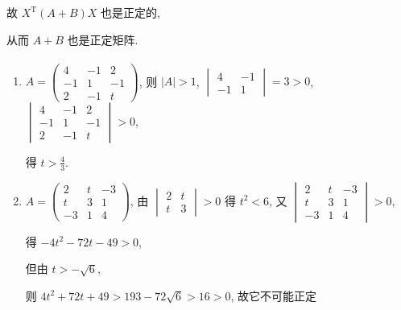 		 故 \( X^{\mathrm{T}}(A+B)X \) 也是正定的,

		 从而 \( A+B \) 也是正定矩阵.

	 \paragraph{} %
		 \begin{enumerate}
			 \item %
			       \( A = \begin{pmatrix}
				       4  & -1 & 2  \\
				       -1 & 1  & -1 \\
				       2  & -1 & t
			       \end{pmatrix} \), 则 \( |A| > 1 \), \( \begin{vmatrix}
				       4  & -1 \\
				       -1 & 1
			       \end{vmatrix} = 3 > 0 \), \( \begin{vmatrix}
				       4  & -1 & 2  \\
				       -1 & 1  & -1 \\
				       2  & -1 & t
			       \end{vmatrix} > 0 \),

			       得 \( t > \frac{4}{3} \).
			 \item %
			       \( A = \begin{pmatrix}
				       2  & t & -3 \\
				       t  & 3 & 1  \\
				       -3 & 1 & 4
			       \end{pmatrix} \), 由 \( \begin{vmatrix}
				       2 & t \\
				       t & 3
			       \end{vmatrix} > 0 \) 得 \( t^{2} < 6 \), 又 \( \begin{vmatrix}
				       2  & t & -3 \\
				       t  & 3 & 1  \\
				       -3 & 1 & 4
			       \end{vmatrix} > 0 \),

			       得 \( -4t^{2} - 72t - 49 > 0 \),

			       但由 \( t > -\sqrt{6} \),

			       则 \( 4t^{2} + 72t + 49 > 193 - 72\sqrt{6} > 16 > 0 \), 故它不可能正定
		 \end{enumerate}


